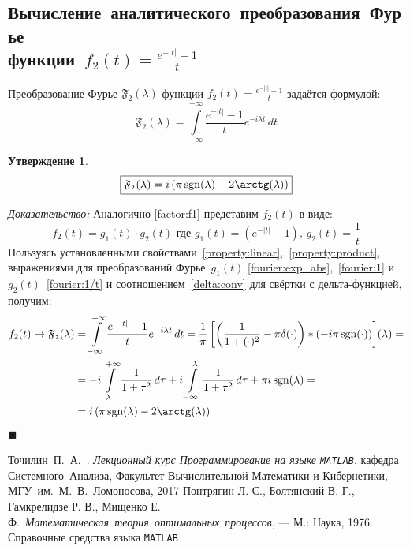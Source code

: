 \documentclass[11pt, oneside, final]{article}
\theoremstyle{break}
\numberwithin{equation}{section}
\theoremstyle{plain}
\newtheorem*{statement}{Утверждение}
\theoremstyle{definition}
\renewenvironment{proof}{
\noindent\textit{Доказательство: }} {\qed}
\newcommand \rarrow{\rightarrow}
\newcommand \intinf[1][{\,dt}]{ \int\limits_{-\infty}^{+\infty}{{#1}}}
\renewcommand \qed{$\blacksquare$}
\DeclareMathOperator{\sgn}{sgn}
\begin{document}
       \subsection{Вычисление~аналитического~преобразования~Фурье\\функции~\(f_2(t) = \frac{e^{-|t|} - 1}{t} \)}
       Преобразование Фурье \( \mathfrak{F_2} (\lambda)\) функции \(f_2(t) = \frac{e^{-|t|} - 1}{t} \) задаётся формулой:
       \[ \mathfrak{F_2} (\lambda) = \intinf[{\dfrac{e^{-|t|} - 1}{t} e^{-i\lambda t}\, dt}] \]
       \begin{statement}
           \begin{equation}\label{eq:fourier:f2} 
               \boxed{ \mathfrak{F_2}(\lambda) = i\left(\pi\sgn(\lambda) - 2\arctg(\lambda)\right) } 
           \end{equation}
       \end{statement}
       \begin{proof}
           Аналогично \eqref{factor:f1} представим \(f_2(t) \) в виде: 
           \begin{equation}\label{factor:f2} 
               f_2(t) = g_1(t) \cdot g_2(t) \text{ где } g_1(t) = \left(e^{-|t|} - 1\right)\text{, } g_2(t) = \dfrac{1}{t} 
           \end{equation}
           Пользуясь установленными свойствами~\ref{property:linear},~\ref{property:product}, выражениями для преобразований Фурье~\(g_1(t)\) \eqref{fourier:exp_abs},~\eqref{fourier:1} и~\(g_2(t)\)~\eqref{fourier:1/t} и соотношением~\eqref{delta:conv} для свёртки с дельта-функцией, получим:
           \[ 
           \begin{split} 
               f_2(t) \rarrow \mathfrak{F_2} (\lambda) &= \intinf[{ \dfrac{e^{-|t|} - 1}{t} e^{-i\lambda t}\, dt}] = 
               \dfrac{1}{\pi}\left[\left({\dfrac{1}{1 + (\cdot)^2} - \pi\delta(\cdot)}\right) * \left({-i \pi \sgn(\cdot)}\right)\right] \negmedspace({\lambda}) = \\
               &= -i\int\limits_{\lambda}^{+\infty}{\dfrac{1}{1 + \tau^2}\, d\tau} + i\int\limits_{-\infty}^{\lambda}{\dfrac{1}{1 + \tau^2}\, d\tau} + \pi i \sgn(\lambda) = \\
               &= i\left(\pi \sgn(\lambda) - 2\arctg(\lambda)\right) 
           \end{split}
           \]
       \end{proof}
       \clearpage
    \begin{thebibliography}{0}
         Точилин~П.~А.~. \emph{Лекционный курс Программирование на языке \texttt{MATLAB}},
        кафедра Системного~Анализа, Факультет Вычислительной Математики и Кибернетики, МГУ~им.~М.~В.~Ломоносова, 
        2017
         Понтрягин Л. С., Болтянский В. Г., Гамкрелидзе Р. В., Мищенко Е. Ф.~\emph{Математическая~теория~оптимальных~процессов}, — М.: Наука, 1976.
         Справочные средства языка \texttt{MATLAB}
    \end{thebibliography}
\end{document}
